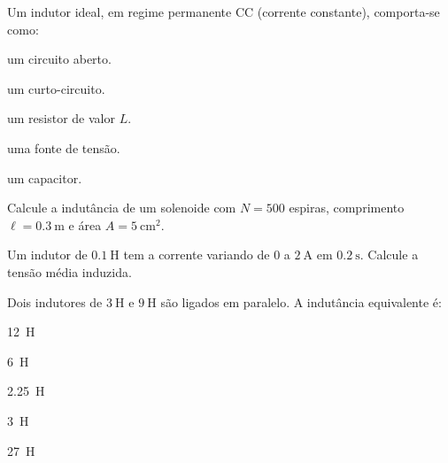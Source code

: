\begin{questao}[1]{}
Um indutor ideal, em regime permanente CC (corrente constante), comporta-se como:
\begin{alternativas}
\item um circuito aberto.
\item um curto-circuito.
\item um resistor de valor $L$.
\item uma fonte de tensão.
\item um capacitor.
\end{alternativas}
\end{questao}

\begin{questao}[1]{}
Calcule a indutância de um solenoide com $N = 500$ espiras, comprimento
$\ell = \SI{0.3}{\meter}$ e área $A = \SI{5}{\centi\meter\squared}$.
\end{questao}

\begin{questao}[1]{}
Um indutor de $\SI{0.1}{\henry}$ tem a corrente variando de $0$ a
$\SI{2}{\ampere}$ em $\SI{0.2}{\second}$. Calcule a tensão média induzida.
\end{questao}

\begin{questao}[1]{}
Dois indutores de $\SI{3}{\henry}$ e $\SI{9}{\henry}$ são ligados em paralelo. A
indutância equivalente é:
\begin{alternativas}[3]
\item \SI{12}{\henry}
\item \SI{6}{\henry}
\item \SI{2.25}{\henry}
\item \SI{3}{\henry}
\item \SI{27}{\henry}
\end{alternativas}
\end{questao}

